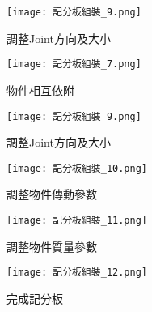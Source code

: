 \begin{figure}[hbt!]
  \begin{center}
    \texttt{[image: 記分板組裝\_9.png]}
  \end{center}
  \caption{調整Joint方向及大小}
  \label{fig:photo}
\end{figure}

\begin{figure}[hbt!]
  \begin{center}
    \texttt{[image: 記分板組裝\_7.png]}
  \end{center}
  \caption{物件相互依附}
  \label{fig:photo}
\end{figure}

\begin{figure}[hbt!]
  \begin{center}
    \texttt{[image: 記分板組裝\_9.png]}
  \end{center}
  \caption{調整Joint方向及大小}
  \label{fig:photo}
\end{figure}

\begin{figure}[hbt!]
  \begin{center}
    \texttt{[image: 記分板組裝\_10.png]}
  \end{center}
  \caption{調整物件傳動參數}
  \label{fig:photo}
\end{figure}

\begin{figure}[hbt!]
  \begin{center}
    \texttt{[image: 記分板組裝\_11.png]}
  \end{center}
  \caption{調整物件質量參數}
  \label{fig:photo}
\end{figure}

\begin{figure}[hbt!]
  \begin{center}
    \texttt{[image: 記分板組裝\_12.png]}
  \end{center}
  \caption{完成記分板}
  \label{fig:photo}
\end{figure}
